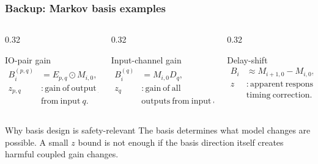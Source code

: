 \documentclass[aspectratio=169]{beamer}
\begin{document}
\begin{frame}
\frametitle{\large \textbf{Backup: Markov basis examples}}
\scriptsize

\begin{columns}[T,onlytextwidth]
\begin{column}{0.32\textwidth}
\begin{block}{IO-pair gain}
\begin{align*}
B_i^{(p,q)} &= E_{p,q}\odot M_{i,0},\\
z_{p,q} &: \mathrm{gain\ of\ output}\ p\\
&\mathrm{from\ input}\ q.
\end{align*}
\end{block}
\end{column}
\begin{column}{0.32\textwidth}
\begin{block}{Input-channel gain}
\begin{align*}
B_i^{(q)} &= M_{i,0}D_q,\\
z_q &: \mathrm{gain\ of\ all}\\
&\mathrm{outputs\ from\ input}\ q.
\end{align*}
\end{block}
\end{column}
\begin{column}{0.32\textwidth}
\begin{block}{Delay-shift}
\begin{align*}
B_i &\approx M_{i+1,0}-M_{i,0},\\
z &: \mathrm{apparent\ response}\\
&\mathrm{timing\ correction}.
\end{align*}
\end{block}
\end{column}
\end{columns}

\vspace{0.15cm}
\begin{block}{Why basis design is safety-relevant}
The basis determines what model changes are possible. A small \(z\) bound is not enough if the basis direction itself creates harmful coupled gain changes.
\end{block}
\end{frame}
\end{document}
